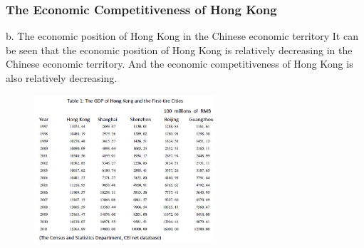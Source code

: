 \documentclass[slidestop,uncompress,mathsans, 12pt]{beamer}
\begin{document}
\begin{frame}[shrink]
\frametitle{The Economic Competitiveness of Hong Kong}
b.  The economic position of Hong Kong in the Chinese economic territory
It can be seen that the economic position of Hong Kong is relatively decreasing in the Chinese economic territory. And the economic competitiveness of Hong Kong is also relatively decreasing.\\
\begin{figure}[h]
\raggedleft
\includegraphics[width=0.6\textwidth]{hk9.png}
\label{threadsVsSync}
\end{figure}
 
\end{frame}
\end{document}
